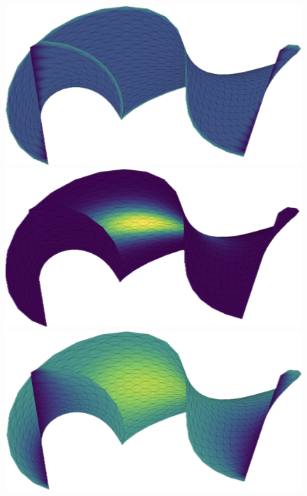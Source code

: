 \begin{figure}
    \includegraphics[width=0.95\linewidth]{../images/helix_BC.png}
    \includegraphics[width=0.95\linewidth]{../images/helix_force.png}    
    \includegraphics[width=0.95\linewidth]{../images/helix_solution.png}
    \label{fig:helix}
\end{figure}


